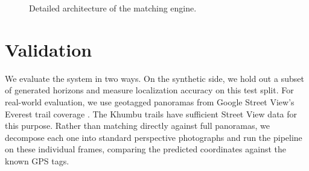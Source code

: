 \begin{figure}[htbp]
    \centering
    \resizebox{\textwidth}{!}{}
    \caption{Detailed architecture of the matching engine.}
    \label{fig:matching_engine}
\end{figure}

\section{Validation}
We evaluate the system in two ways. On the synthetic side, we hold out a subset of generated horizons and measure localization accuracy on this test split. For real-world evaluation, we use geotagged panoramas from Google Street View's Everest trail coverage \cite{google2015streetview}. The Khumbu trails have sufficient Street View data for this purpose. Rather than matching directly against full panoramas, we decompose each one into standard perspective photographs and run the pipeline on these individual frames, comparing the predicted coordinates against the known GPS tags.
